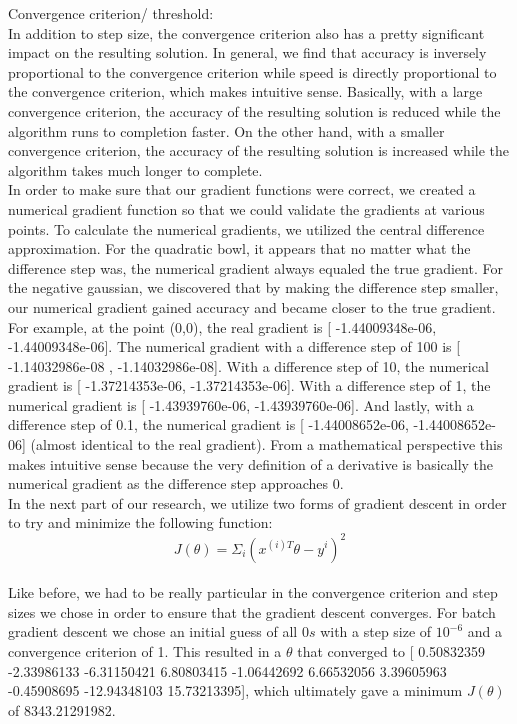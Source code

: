 \documentclass{article}
\begin{document}
Convergence criterion/ threshold: \\

In addition to step size, the convergence criterion also has a pretty significant impact on the resulting solution. In general, we find that accuracy is inversely proportional to the convergence criterion while speed is directly proportional to the convergence criterion, which makes intuitive sense. Basically, with a large convergence criterion, the accuracy of the resulting solution is reduced while the algorithm runs to completion faster. On the other hand, with a smaller convergence criterion, the accuracy of the resulting solution is increased while the algorithm takes much longer to complete. \\

In order to make sure that our gradient functions were correct, we created a numerical gradient function so that we could validate the gradients at various points. To calculate the numerical gradients, we utilized the central difference approximation. For the quadratic bowl, it appears that no matter what the difference step was, the numerical gradient always equaled the true gradient. For the negative gaussian, we discovered that by making the difference step smaller, our numerical gradient gained accuracy and became closer to the true gradient. For example, at the point (0,0), the real gradient is [ -1.44009348e-06,   -1.44009348e-06]. The numerical gradient with a difference step of 100 is [ -1.14032986e-08 , -1.14032986e-08]. With a difference step of 10, the numerical gradient is [ -1.37214353e-06,  -1.37214353e-06]. With a difference step of 1, the numerical gradient is [ -1.43939760e-06,  -1.43939760e-06]. And lastly, with a difference step of 0.1, the numerical gradient is [ -1.44008652e-06,  -1.44008652e-06] (almost identical to the real gradient). From a mathematical perspective this makes intuitive sense because the very definition of a derivative is basically the numerical gradient as the difference step approaches 0. \\

In the next part of our research, we utilize two forms of gradient descent in order to try and minimize the following function: \\
$$J(\theta) = \Sigma_{i}(x^{(i)T}\theta - y^{i})^2$$ \\ 

Like before, we had to be really particular in the convergence criterion and step sizes we chose in order to ensure that the gradient descent converges. For batch gradient descent we chose an initial guess of all $0s$ with a step size of $10^{-6}$ and a convergence criterion of 1. This resulted in a $\theta$ that converged to  [  0.50832359  -2.33986133  -6.31150421   6.80803415  -1.06442692 6.66532056   3.39605963  -0.45908695 -12.94348103  15.73213395], which ultimately gave a minimum $J(\theta)$ of 8343.21291982. \\
\end{document}

